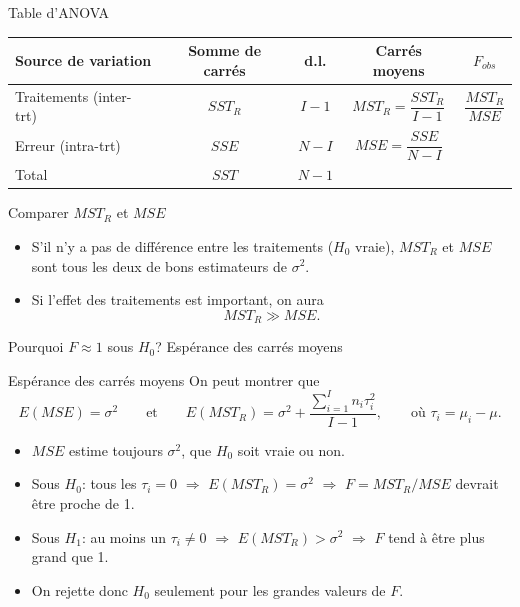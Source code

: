 \documentclass{BeamerTemplate}
\begin{document}
\begin{frame}[t]{Table d'ANOVA}

\vspace{5mm}
\begin{center}
\renewcommand{\arraystretch}{2.3}
\begin{tabular}{lcccc}
\toprule
Source de variation & Somme de carrés & d.l. & Carrés moyens & $F_{obs}$\\
\midrule
Traitements (inter-trt) & $SST_R$ & $I-1$ & $MST_R=\dfrac{SST_R}{I-1}$ & $\dfrac{MST_R}{MSE}$\\
Erreur (intra-trt)     & $SSE$   & $N-I$ & $MSE=\dfrac{SSE}{N-I}$   & \\
\midrule
Total                  & $SST$   & $N-1$ &                          & \\
\bottomrule
\end{tabular}
\end{center}

\end{frame}

\begin{frame}[t]{Comparer $MST_R$ et $MSE$}

\begin{itemize}\itemsep4mm
  \item S'il n'y a pas de différence entre les traitements ($H_0$ vraie),
  $MST_R$ et $MSE$ sont tous les deux de bons estimateurs de $\sigma^2$.
  \item<2-> Si l'effet des traitements est important, on aura
  \[
  MST_R \gg MSE.
  \]
\end{itemize}

\bigskip
{}

\end{frame}

\begin{frame}[t]{Pourquoi $F\approx 1$ sous $H_0$? Espérance des carrés moyens}

\begin{Boite}{Espérance des carrés moyens}
On peut montrer que
\[
E(MSE)=\sigma^2
\qquad\text{et}\qquad
E(MST_R)=\sigma^2+\frac{\sum_{i=1}^{I} n_i\tau_i^2}{I-1},
\qquad\text{où } \tau_i=\mu_i-\mu.
\]
\end{Boite}

\small
\begin{itemize}\itemsep1mm
  \item $MSE$ estime toujours $\sigma^2$, que $H_0$ soit vraie ou non.
  \item<2-> Sous $H_0$: tous les $\tau_i=0$ $\Rightarrow$ $E(MST_R)=\sigma^2$
  $\Rightarrow$ $F=MST_R/MSE$ devrait être \alert{proche de 1}.
  \item<2-> Sous $H_1$: au moins un $\tau_i\neq0$ $\Rightarrow$ $E(MST_R)>\sigma^2$
  $\Rightarrow$ $F$ tend à être \alert{plus grand que 1}.
  \item<3-> On rejette donc $H_0$ seulement pour les \alert{grandes} valeurs de $F$.
\end{itemize}

\end{frame}
\end{document}
